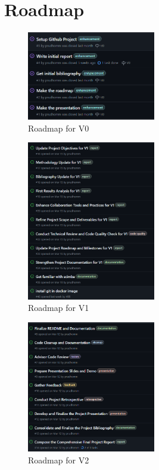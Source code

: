 \documentclass[12pt]{article}
\begin{document}

\newpage
\section{Roadmap}
\begin{figure}[H]
    \centering
    \includegraphics[width=0.5\textwidth]{images/roadmapV0.png}
    \caption{Roadmap for V0}
\end{figure}

\begin{figure}[H]
    \centering
    \includegraphics[width=0.5\textwidth]{images/roadmapV1.png}
    \caption{Roadmap for V1}
\end{figure}

\begin{figure}[H]
    \centering
    \includegraphics[width=0.5\textwidth]{images/roadmapV2.png}
    \caption{Roadmap for V2}
\end{figure}
\end{document}
